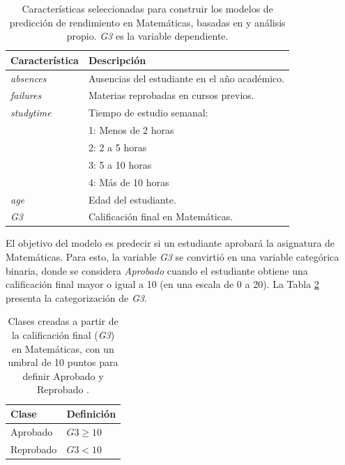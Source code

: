 \begin{table}[H]
    \centering
    \begin{tabular}{ll}
        \toprule
        \textbf{Característica} & \textbf{Descripción} \\
        \midrule
        \textit{absences} & Ausencias del estudiante en el año académico. \\
        \textit{failures} & Materias reprobadas en cursos previos. \\
        \textit{studytime} & Tiempo de estudio semanal: \\
            & 1: Menos de 2 horas \\
            & 2: 2 a 5 horas \\
            & 3: 5 a 10 horas \\
            & 4: Más de 10 horas \\
        \textit{age} & Edad del estudiante. \\
        \midrule
        \textit{G3} & Calificación final en Matemáticas. \\
        \bottomrule
    \end{tabular}
    \caption{Características seleccionadas para construir los modelos de predicción de rendimiento en Matemáticas, basadas en \cite{cortez-2014} y análisis propio. \textit{G3} es la variable dependiente.}
    \label{tab:math-data-vars}
\end{table}

El objetivo del modelo es predecir si un estudiante aprobará la asignatura de Matemáticas. Para esto, la variable \textit{G3} se convirtió en una variable categórica binaria, donde se considera \textit{Aprobado} cuando el estudiante obtiene una calificación final mayor o igual a 10 (en una escala de 0 a 20). La Tabla \ref{tab:math-data-clases} presenta la categorización de \textit{G3}.

\begin{table}[H]
    \centering
    \begin{tabular}{ll}
        \toprule
        \textbf{Clase} & \textbf{Definición} \\
        \midrule
        Aprobado & $G3 \geq 10$\\
        Reprobado & $G3 < 10$ \\
        \bottomrule
    \end{tabular}
    \caption{Clases creadas a partir de la calificación final (\textit{G3}) en Matemáticas, con un umbral de 10 puntos para definir Aprobado y Reprobado \cite{cortez2014student}.}
    \label{tab:math-data-clases}
\end{table}



